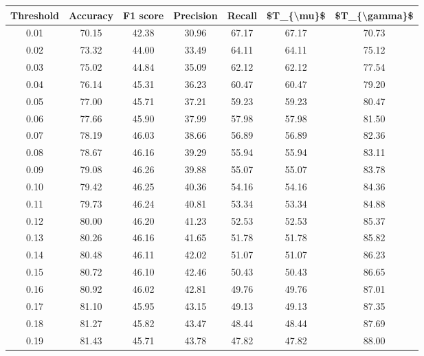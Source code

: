 \begin{tabular}{|c|c|c|c|c|c|c|}
\toprule
 Threshold &  Accuracy &  F1 score &  Precision &  Recall &  \$T\_\{\textbackslash mu\}\$ &  \$T\_\{\textbackslash gamma\}\$ \\
\hline
      0.01 &     70.15 &     42.38 &      30.96 &   67.17 &      67.17 &         70.73 \\
      0.02 &     73.32 &     44.00 &      33.49 &   64.11 &      64.11 &         75.12 \\
      0.03 &     75.02 &     44.84 &      35.09 &   62.12 &      62.12 &         77.54 \\
      0.04 &     76.14 &     45.31 &      36.23 &   60.47 &      60.47 &         79.20 \\
      0.05 &     77.00 &     45.71 &      37.21 &   59.23 &      59.23 &         80.47 \\
      0.06 &     77.66 &     45.90 &      37.99 &   57.98 &      57.98 &         81.50 \\
      0.07 &     78.19 &     46.03 &      38.66 &   56.89 &      56.89 &         82.36 \\
      0.08 &     78.67 &     46.16 &      39.29 &   55.94 &      55.94 &         83.11 \\
      0.09 &     79.08 &     46.26 &      39.88 &   55.07 &      55.07 &         83.78 \\
      0.10 &     79.42 &     46.25 &      40.36 &   54.16 &      54.16 &         84.36 \\
      0.11 &     79.73 &     46.24 &      40.81 &   53.34 &      53.34 &         84.88 \\
      0.12 &     80.00 &     46.20 &      41.23 &   52.53 &      52.53 &         85.37 \\
      0.13 &     80.26 &     46.16 &      41.65 &   51.78 &      51.78 &         85.82 \\
      0.14 &     80.48 &     46.11 &      42.02 &   51.07 &      51.07 &         86.23 \\
      0.15 &     80.72 &     46.10 &      42.46 &   50.43 &      50.43 &         86.65 \\
      0.16 &     80.92 &     46.02 &      42.81 &   49.76 &      49.76 &         87.01 \\
      0.17 &     81.10 &     45.95 &      43.15 &   49.13 &      49.13 &         87.35 \\
      0.18 &     81.27 &     45.82 &      43.47 &   48.44 &      48.44 &         87.69 \\
      0.19 &     81.43 &     45.71 &      43.78 &   47.82 &      47.82 &         88.00 \\

\end{tabular}
